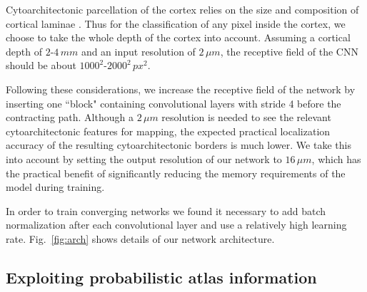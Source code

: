 \documentclass{article}
\begin{document}
Cytoarchitectonic parcellation of the cortex relies on the size and composition of cortical laminae \cite{schleicher1999}. 
Thus for the classification of any pixel inside the cortex, we choose to take the whole depth of the cortex into account. 
Assuming a cortical depth of $2$-$4\,mm$ and an input resolution of $2\,\mu m$, the receptive field of the CNN should be about $1000^2$-$2000^2\,px^2$. %

Following these considerations, we increase the receptive field of the network by inserting one ``block" containing convolutional layers with stride 4 before the contracting path. 
Although a $2\,\mu m$ resolution is needed to see the relevant cytoarchitectonic features for mapping, the expected practical localization accuracy of the resulting cytoarchitectonic borders is much lower.
We take this into account by setting the output resolution of our network to $16\,\mu m$, which has the practical benefit of significantly reducing the memory requirements of the model during training.

In order to train converging networks we found it necessary to add batch normalization after each convolutional layer and use a relatively high learning rate. 
Fig.~\ref{fig:arch} shows details of our network architecture.  

\vspace*{-.5\baselineskip}
\subsection{Exploiting probabilistic atlas information}
\label{sec:arch:prior}
\vspace*{-.5\baselineskip}
\end{document}
